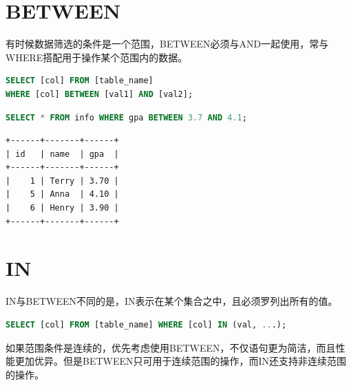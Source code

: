 \documentclass[12pt, openany, oneside]{book}
\begin{document}
\section{BETWEEN}

有时候数据筛选的条件是一个范围，BETWEEN必须与AND一起使用，常与WHERE搭配用于操作某个范围内的数据。

\vspace{-0.5cm}

\begin{lstlisting}[language=SQL]
SELECT [col] FROM [table_name]
WHERE [col] BETWEEN [val1] AND [val2];
\end{lstlisting}

\vspace{0.5cm}


\begin{lstlisting}[language=SQL]
SELECT * FROM info WHERE gpa BETWEEN 3.7 AND 4.1;
\end{lstlisting}

\begin{tcolorbox}
	\begin{verbatim}
+------+-------+------+
| id   | name  | gpa  |
+------+-------+------+
|    1 | Terry | 3.70 |
|    5 | Anna  | 4.10 |
|    6 | Henry | 3.90 |
+------+-------+------+
\end{verbatim}
\end{tcolorbox}

\vspace{0.5cm}

\section{IN}

IN与BETWEEN不同的是，IN表示在某个集合之中，且必须罗列出所有的值。

\vspace{-0.5cm}

\begin{lstlisting}[language=SQL]
SELECT [col] FROM [table_name] WHERE [col] IN (val, ...);
\end{lstlisting}

如果范围条件是连续的，优先考虑使用BETWEEN，不仅语句更为简洁，而且性能更加优异。但是BETWEEN只可用于连续范围的操作，而IN还支持非连续范围的操作。\\

\end{document}
